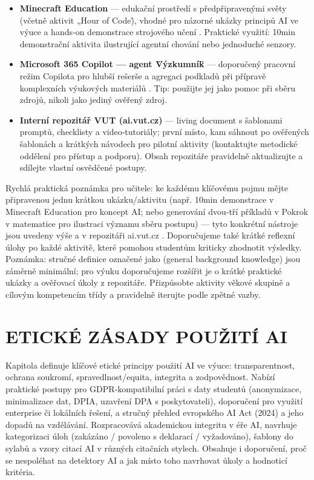 \documentclass{report}%
\begin{document}
\begin{itemize}
\item \textbf{Minecraft Education} --- edukační prostředí s předpřipravenými světy (včetně aktivit „Hour of Code\"), vhodné pro názorné ukázky principů AI ve výuce a hands‑on demonstrace strojového učení \cite{kb_ai_101_tipu_pdf_04e4a115_page_15_2}. Praktické využití: 10min demonstrační aktivita ilustrující agentní chování nebo jednoduché senzory.
\item \textbf{Microsoft 365 Copilot — agent \"Výzkumník\"} --- doporučený pracovní režim Copilota pro hlubší rešerše a agregaci podkladů při přípravě komplexních výukových materiálů \cite{kb_ai_101_tipu_pdf_04e4a115_page_48_1}. Tip: použijte jej jako pomoc při sběru zdrojů, nikoli jako jediný ověřený zdroj.
\item \textbf{Interní repozitář VUT (ai.vut.cz)} --- living document s šablonami promptů, checklisty a video‑tutoriály; první místo, kam sáhnout po ověřených šablonách a krátkých návodech pro pilotní aktivity (kontaktujte metodické oddělení pro přístup a podporu). Obsah repozitáře pravidelně aktualizujte a sdílejte vlastní osvědčené postupy.
\end{itemize}
Rychlá praktická poznámka pro učitele: ke každému klíčovému pojmu mějte připravenou jednu krátkou ukázku/aktivitu (např. 10min demonstrace v Minecraft Education pro koncept AI; nebo generování dvou‑tří příkladů v Pokrok v matematice pro ilustraci významu sběru postupu) — tyto konkrétní nástroje jsou uvedeny výše a v repozitáři ai.vut.cz \cite{kb_ai_101_tipu_pdf_04e4a115_page_15_2, kb_ai_101_tipu_pdf_04e4a115_page_8_1, kb_ai_101_tipu_pdf_04e4a115_page_48_1}. Doporučujeme také krátké reflexní úlohy po každé aktivitě, které pomohou studentům kriticky zhodnotit výsledky.
Poznámka: stručné definice označené jako (general background knowledge) jsou záměrně minimální; pro výuku doporučujeme rozšířit je o krátké praktické ukázky a ověřovací úkoly z repozitáře. Přizpůsobte aktivity věkové skupině a cílovým kompetencím třídy a pravidelně iterujte podle zpětné vazby.%

%
\chapter{ETICKÉ ZÁSADY POUŽITÍ AI}%
Kapitola definuje klíčové etické principy použití AI ve výuce: transparentnost, ochrana soukromí, spravedlnost/equita, integrita a zodpovědnost. Nabízí praktické postupy pro GDPR‑kompatibilní práci s daty studentů (anonymizace, minimalizace dat, DPIA, uzavření DPA s poskytovateli), doporučení pro využití enterprise či lokálních řešení, a stručný přehled evropského AI Act (2024) a jeho dopadů na vzdělávání. Rozpracovává akademickou integritu v éře AI, navrhuje kategorizaci úloh (zakázáno / povoleno s deklarací / vyžadováno), šablony do sylabů a vzory citací AI v různých citačních stylech. Obsahuje i doporučení, proč se nespoléhat na detektory AI a jak místo toho navrhovat úkoly a hodnoticí kritéria.%
\end{document}

